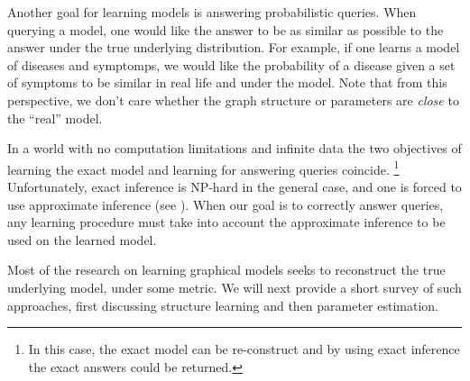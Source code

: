 
Another goal for learning models %
is answering probabilistic queries.
When querying a model, one would like the answer to be as similar as possible to the answer under the true underlying distribution.
For example, if one learns a model of diseases and symptomps, we would like the probability of a disease given a set of symptoms to be similar in real life and under the model.
Note that from this perspective, we don't care whether the graph structure or parameters are {\em close} to the ``real'' model. 


In a world with no computation limitations and infinite data the two objectives of learning the exact model and learning for answering queries coincide.
\footnote{In this case, the exact model can be re-construct and by using exact inference the exact answers could be returned.}
Unfortunately, exact inference is NP-hard in the general case, and one is forced to use approximate inference (see ).
When our goal is to correctly answer queries, any learning procedure must take into account the approximate inference to be used on the learned model.



Most of the research on learning graphical models seeks to reconstruct the true underlying model, under some metric. We will next provide a short survey of such approaches, first discussing structure learning and then parameter estimation.




